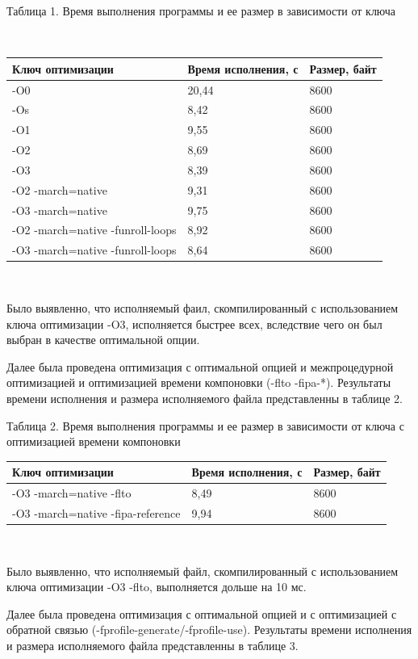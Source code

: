 \documentclass[12pt,a4paper]{scrartcl}
\begin{document}
\begin{center}
\caption{Таблица 1. Время выполнения программы и ее размер в зависимости от ключа}\\
\begin{tabular}{| l | l | l |}
\hline
Ключ оптимизации & Время исполнения, с & Размер, байт  \\ \hline
-O0 & 20,44 & 8600\\
-Os & 8,42 & 8600\\
-O1 & 9,55 & 8600\\
-O2 & 8,69 & 8600\\
-O3 & 8,39 & 8600\\
-O2 -march=native &	9,31 &	8600\\
-O3 -march=native &	9,75	& 8600\\
-O2 -march=native -funroll-loops &	8,92	& 8600\\
-O3 -march=native -funroll-loops &	8,64	& 8600\\
\hline
\end{tabular}\\
\end{center}
\par
Было выявленно, что исполняемый фаил, скомпилированный с использованием ключа оптимизации -O3, исполняется быстрее всех, вследствие чего он был выбран в качестве оптимальной опции.
\par
Далее была проведена оптимизация с оптимальной опцией и межпроцедурной оптимизацией и оптимизацией времени компоновки (-flto -fipa-*). Результаты времени исполнения и размера исполняемого файла представленны в таблице 2.

\begin{center}
\caption{Таблица 2. Время выполнения программы и ее размер в зависимости от ключа с оптимизацией времени компоновки}
\begin{tabular}{| l | l | l |}
\hline
Ключ оптимизации & Время исполнения, с & Размер, байт  \\ \hline
-O3 -march=native -flto &	8,49 & 8600\\
-O3 -march=native -fipa-reference &	9,94 & 8600\\
\hline
\end{tabular}\\
\end{center}
\par
Было выявленно, что исполняемый файл, скомпилированный с использованием ключа оптимизации -O3 -flto, выполняется дольше на 10 мс.
\par
Далее была проведена оптимизация с оптимальной опцией и с оптимизацией с обратной связью (-fprofile-generate/-fprofile-use). Результаты времени исполнения и размера исполняемого файла представленны в таблице 3.
\end{document}
